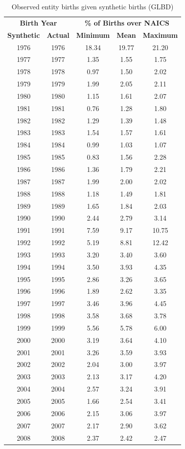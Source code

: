 \documentclass[10pt,twoside]{article}
\begin{document}
\begin{table}[H]
\centering\footnotesize
\caption{Observed entity births given synthetic births (GLBD)} \label{tab:GLBD:Probability} \medskip
\renewcommand{\arraystretch}{1}
\begin{tabular}{c c| c c c}
\toprule
\multicolumn{2}{c|}{\textbf{Birth Year}} &  \multicolumn{3}{c}{\textbf{\% of Births over NAICS}}\\
\textbf{Synthetic}&\textbf{Actual}&\textbf{Minimum}&\textbf{Mean}&\textbf{Maximum}\\
\midrule
1976&1976&18.34&19.77&21.20\\
1977&1977&1.35&1.55&1.75\\
1978&1978&0.97&1.50&2.02\\
1979&1979&1.99&2.05&2.11\\
1980&1980&1.15&1.61&2.07\\
1981&1981&0.76&1.28&1.80\\
1982&1982&1.29&1.39&1.48\\
1983&1983&1.54&1.57&1.61\\
1984&1984&0.99&1.03&1.07\\
1985&1985&0.83&1.56&2.28\\
1986&1986&1.36&1.79&2.21\\
1987&1987&1.99&2.00&2.02\\
1988&1988&1.18&1.49&1.81\\
1989&1989&1.65&1.84&2.03\\
1990&1990&2.44&2.79&3.14\\
1991&1991&7.59&9.17&10.75\\
1992&1992&5.19&8.81&12.42\\
1993&1993&3.20&3.40&3.60\\
1994&1994&3.50&3.93&4.35\\
1995&1995&2.86&3.26&3.65\\
1996&1996&1.89&2.62&3.35\\
1997&1997&3.46&3.96&4.45\\
1998&1998&3.58&3.68&3.78\\
1999&1999&5.56&5.78&6.00\\
2000&2000&3.19&3.64&4.10\\
2001&2001&3.26&3.59&3.93\\
2002&2002&2.04&3.00&3.97\\
2003&2003&2.13&3.17&4.20\\
2004&2004&2.57&3.24&3.91\\
2005&2005&1.66&2.54&3.41\\
2006&2006&2.15&3.06&3.97\\
2007&2007&2.17&2.90&3.62\\
2008&2008&2.37&2.42&2.47\\
 \bottomrule
\end{tabular} 
\\
\justify
\end{table}
  
\end{document}
